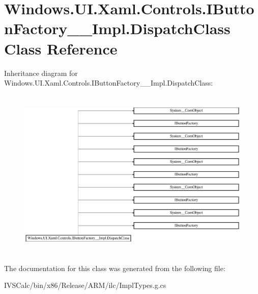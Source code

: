\hypertarget{class_windows_1_1_u_i_1_1_xaml_1_1_controls_1_1_i_button_factory_____impl_1_1_dispatch_class}{}\section{Windows.\+U\+I.\+Xaml.\+Controls.\+I\+Button\+Factory\+\_\+\+\_\+\+Impl.\+Dispatch\+Class Class Reference}
\label{class_windows_1_1_u_i_1_1_xaml_1_1_controls_1_1_i_button_factory_____impl_1_1_dispatch_class}
Inheritance diagram for Windows.\+U\+I.\+Xaml.\+Controls.\+I\+Button\+Factory\+\_\+\+\_\+\+Impl.\+Dispatch\+Class\+:\begin{figure}[H]
\begin{center}
\leavevmode
\includegraphics[height=8.235293cm]{class_windows_1_1_u_i_1_1_xaml_1_1_controls_1_1_i_button_factory_____impl_1_1_dispatch_class}
\end{center}
\end{figure}


The documentation for this class was generated from the following file\+:\begin{DoxyCompactItemize}
\item 
I\+V\+S\+Calc/bin/x86/\+Release/\+A\+R\+M/ilc/Impl\+Types.\+g.\+cs\end{DoxyCompactItemize}

